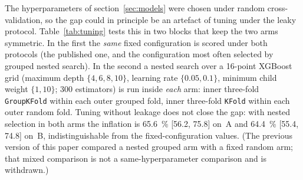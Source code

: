 \documentclass{iopjournal}
\newcommand{\ci}[2]{[\num{#1}, \num{#2}]}
\begin{document}
The hyperparameters of section~\ref{sec:models} were chosen under random cross-validation, so the
gap could in principle be an artefact of tuning under the leaky protocol. Table~\ref{tab:tuning}
tests this in two blocks that keep the two arms symmetric. In the first the \emph{same} fixed
configuration is scored under both protocols (the published one, and the configuration most often
selected by grouped nested search). In the second a nested search over a \num{16}-point XGBoost
grid (maximum depth $\{4,6,8,10\}$, learning rate $\{0.05,0.1\}$, minimum child weight
$\{1,10\}$; \num{300} estimators) is run inside \emph{each} arm: inner three-fold
\texttt{GroupKFold} within each outer grouped fold, inner three-fold \texttt{KFold} within each
outer random fold. Tuning without leakage does not close the gap: with nested selection in both
arms the inflation is \SI{65.6}{\percent} \ci{56.2}{75.8} on~A and \SI{64.4}{\percent}
\ci{55.4}{74.8} on~B, indistinguishable from the fixed-configuration values. (The previous version
of this paper compared a nested grouped arm with a fixed random arm; that mixed comparison is not a
same-hyperparameter comparison and is withdrawn.)
\end{document}

